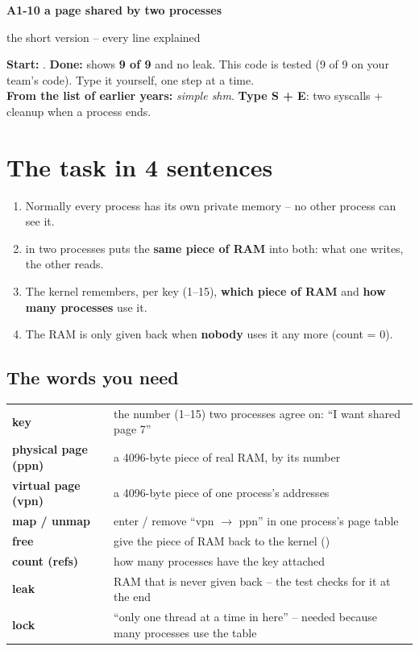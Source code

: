 \documentclass[11pt]{report}
\begin{document}
{\centering
  {\LARGE\bfseries A1-10 a page shared by two processes\par}
  \vspace{4pt}
  {\large the short version -- every line explained\par}
  \vspace{8pt}
}

\begin{infobox}
\textbf{Start:} . \textbf{Done:}  shows \textbf{9 of 9} and no leak.
This code is tested (9 of 9 on your team's code). Type it yourself, one step at a time.\\[3pt]
\textbf{From the list of earlier years:} \emph{simple shm}. \textbf{Type S + E}: two syscalls + cleanup when a process ends.
\end{infobox}

\section*{The task in 4 sentences}

\begin{enumerate}
  \item Normally every process has its own private memory -- no other process can see it.
  \item {} in two processes puts the \textbf{same piece of RAM} into both: what one writes, the other reads.
  \item The kernel remembers, per key (1--15), \textbf{which piece of RAM} and \textbf{how many processes} use it.
  \item The RAM is only given back when \textbf{nobody} uses it any more (count = 0).
\end{enumerate}

\subsection*{The words you need}

{\small
\begin{tabular}{@{}L{3.3cm} L{12.1cm}@{}}
\toprule
\textbf{key} & the number (1--15) two processes agree on: ``I want shared page 7''\\
\textbf{physical page (ppn)} & a 4096-byte piece of real RAM, by its number\\
\textbf{virtual page (vpn)} & a 4096-byte piece of one process's addresses\\
\textbf{map / unmap} & enter / remove ``vpn $\to$ ppn'' in one process's page table\\
\textbf{free} & give the piece of RAM back to the kernel ()\\
\textbf{count (refs)} & how many processes have the key attached\\
\textbf{leak} & RAM that is never given back -- the test checks for it at the end\\
\textbf{lock} & ``only one thread at a time in here'' -- needed because many processes use the table\\
\bottomrule
\end{tabular}}
\end{document}
